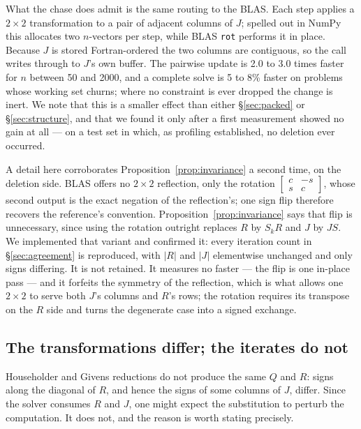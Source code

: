 \documentclass[11pt,a4paper]{article}
\theoremstyle{plain}
\theoremstyle{remark}
\begin{document}
What the chase does admit is the same routing to the BLAS. Each step applies a
$2 \times 2$ transformation to a pair of adjacent columns of $J$; spelled out in
NumPy this allocates two $n$-vectors per step, while BLAS \texttt{rot} performs it
in place. Because $J$ is stored Fortran-ordered the two columns are contiguous,
so the call writes through to $J$'s own buffer. The pairwise update is 2.0 to
3.0 times faster for $n$ between 50 and 2000, and a complete solve is 5 to
8\% faster on problems whose working set churns; where no constraint is ever
dropped the change is inert. We note that this is a smaller effect than either
\S\ref{sec:packed} or \S\ref{sec:structure}, and that we found it only after a
first measurement showed no gain at all --- on a test set in which, as profiling
established, no deletion ever occurred.

A detail here corroborates Proposition~\ref{prop:invariance} a second time, on the
deletion side. BLAS offers no $2 \times 2$ reflection, only the rotation
$\left[\begin{smallmatrix} c & -s \\ s & c \end{smallmatrix}\right]$, whose second
output is the exact negation of the reflection's; one sign flip therefore recovers
the reference's convention. Proposition~\ref{prop:invariance} says that flip is
unnecessary, since using the rotation outright replaces $R$ by $S_k R$ and $J$ by
$J S$. We implemented that variant and confirmed it: every iteration count in
\S\ref{sec:agreement} is reproduced, with $|R|$ and $|J|$ elementwise unchanged
and only signs differing. It is not retained. It measures no faster --- the flip
is one in-place pass --- and it forfeits the symmetry of the reflection, which is
what allows one $2 \times 2$ to serve both $J$'s columns and $R$'s rows; the
rotation requires its transpose on the $R$ side and turns the degenerate case into
a signed exchange.

\subsection{The transformations differ; the iterates do not}

Householder and Givens reductions do not produce the same $Q$ and $R$: signs
along the diagonal of $R$, and hence the signs of some columns of $J$, differ.
Since the solver consumes $R$ and $J$, one might expect the substitution to
perturb the computation. It does not, and the reason is worth stating precisely.
\end{document}
